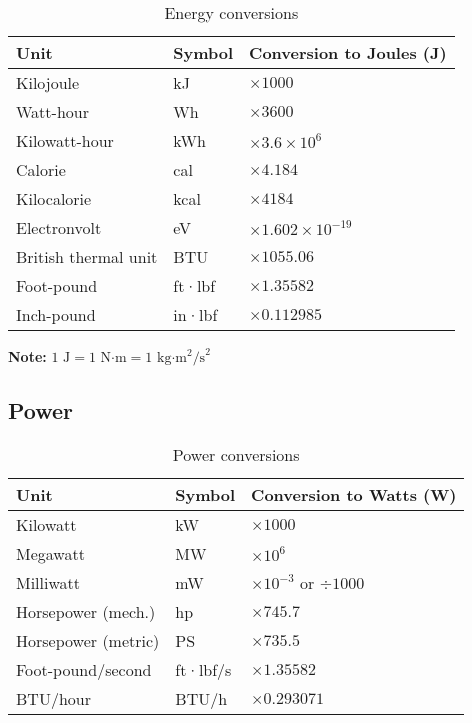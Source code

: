 \begin{table}[H]
\centering
\begin{tabular}{|l|l|l|}
\hline
\rowcolor{blue!20}
\textbf{Unit} & \textbf{Symbol} & \textbf{Conversion to Joules (J)} \\
\hline
Kilojoule & kJ & $\times 1000$ \\
\hline
Watt-hour & Wh & $\times 3600$ \\
\hline
Kilowatt-hour & kWh & $\times 3.6 \times 10^{6}$ \\
\hline
Calorie & cal & $\times 4.184$ \\
\hline
Kilocalorie & kcal & $\times 4184$ \\
\hline
Electronvolt & eV & $\times 1.602 \times 10^{-19}$ \\
\hline
\rowcolor{yellow!20}
British thermal unit & BTU & $\times 1055.06$ \\
\hline
\rowcolor{yellow!20}
Foot-pound & ft·lbf & $\times 1.35582$ \\
\hline
\rowcolor{yellow!20}
Inch-pound & in·lbf & $\times 0.112985$ \\
\hline
\end{tabular}
\caption{Energy conversions}
\end{table}

\textbf{Note:} $1 \text{ J} = 1 \text{ N·m} = 1 \text{ kg·m}^2\text{/s}^2$

\subsection{Power}

\begin{table}[H]
\centering
\begin{tabular}{|l|l|l|}
\hline
\rowcolor{blue!20}
\textbf{Unit} & \textbf{Symbol} & \textbf{Conversion to Watts (W)} \\
\hline
Kilowatt & kW & $\times 1000$ \\
\hline
Megawatt & MW & $\times 10^{6}$ \\
\hline
Milliwatt & mW & $\times 10^{-3}$ or $\div 1000$ \\
\hline
\rowcolor{yellow!20}
Horsepower (mech.) & hp & $\times 745.7$ \\
\hline
\rowcolor{yellow!20}
Horsepower (metric) & PS & $\times 735.5$ \\
\hline
\rowcolor{yellow!20}
Foot-pound/second & ft·lbf/s & $\times 1.35582$ \\
\hline
BTU/hour & BTU/h & $\times 0.293071$ \\
\hline
\end{tabular}
\caption{Power conversions}
\end{table}

